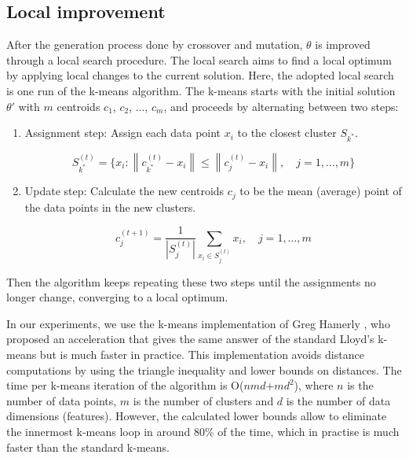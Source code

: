 \subsection{Local improvement}
After the generation process done by crossover and mutation, $\theta$ is improved through a local search procedure. The local search aims to find a local optimum by applying local changes to the current solution. Here, the adopted local search is one run of the k-means algorithm. The k-means starts with the initial solution $\theta'$ with $m$ centroids $c_1$, $c_2$, ..., $c_m$, and proceeds by alternating between two steps:

\begin{enumerate}

	\item Assignment step: Assign each data point $x_i$ to the closest cluster $S_{k^{*}}$.
	
	\begin{equation}
	S_{k^{*}}^{(t)} = \{ x_i: \left \| c_{k^{*}}^{(t)} - x_i \right \| \leq  \left \| c_{j}^{(t)} - x_i \right \|, \quad j = 1, ..., m \}
	\end{equation}
	
	\item Update step: Calculate the new centroids $c_j$ to be the mean (average) point of the data points in the new clusters.
	
	\begin{equation}
	c_{j}^{(t+1)} = \frac{1}{\left | S_{j}^{(t)} \right |} \sum_{x_i \in S_{j}^{(t)}} x_i, \quad j = 1, ..., m
	\end{equation}
		
\end{enumerate}

Then the algorithm keeps repeating these two steps until the assignments no longer change, converging to a local optimum.

In our experiments, we use the k-means implementation of Greg Hamerly \cite{Hamerly2010}, who proposed an acceleration that gives the same answer of the standard Lloyd's k-means \cite{Lloyd1982} but is much faster in practice. This implementation avoids distance computations by using the triangle inequality and lower bounds on distances. The time per k-means iteration of the algorithm is O($nmd$+$md^2$), where $n$ is the number of data points, $m$ is the number of clusters and $d$ is the number of data dimensions (features). However, the calculated lower bounds allow to eliminate the innermost k-means loop in around 80\% of the time, which in practise is much faster than the standard k-means.

